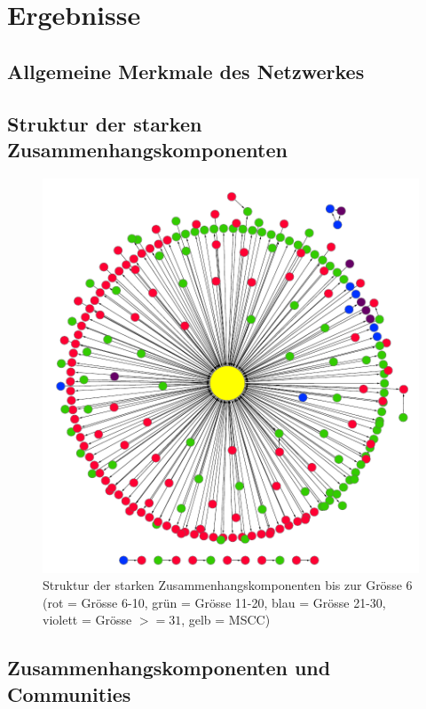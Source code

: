 
\chapter{Ergebnisse}
\label{ch:Ergebnisse}

\section{Allgemeine Merkmale des Netzwerkes}
\label{sec:allg-merkm-des}

\section{Struktur der starken Zusammenhangskomponenten}
\label{sec:komponentenstruktur}

\begin{figure}[h]
  \centering
  \includegraphics[scale=1.0]{images/component-metagraph-8.pdf}
  \caption{Struktur der starken Zusammenhangskomponenten bis zur
    Grösse 6 (rot = Grösse 6-10, grün = Grösse 11-20, blau = Grösse
    21-30, violett = Grösse $>= 31$, gelb = MSCC)}
  \label{fig:komponenten-struktur}
\end{figure}

\section{Zusammenhangskomponenten und Communities}
\label{sec:zusamm-und-comm}


